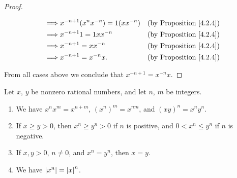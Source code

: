 \begin{proof}
\begin{itemize}
\begin{align*}
                  \implies & x^{-n + 1} (x^n x^{-n}) = 1(x x^{-n}) & \text{(by Proposition \ref{4.2.4})} \\
                  \implies & x^{-n + 1} 1 = 1x x^{-n}              & \text{(by Proposition \ref{4.2.4})} \\
                  \implies & x^{-n + 1} = x x^{-n}                 & \text{(by Proposition \ref{4.2.4})} \\
                  \implies & x^{-n + 1} = x^{-n} x.                & \text{(by Proposition \ref{4.2.4})}
              \end{align*}
    \end{itemize}
    From all cases above we conclude that \(x^{-n + 1} = x^{-n} x\).
\end{proof}

\begin{proposition}\label{4.3.12}
    Let \(x\), \(y\) be nonzero rational numbers, and let \(n\), \(m\) be integers.
    \begin{enumerate}
        \item We have \(x^n x^m = x^{n + m}\), \((x^n)^m = x^{nm}\), and \((xy)^n = x^n y^n\).
        \item If \(x \geq y > 0\), then \(x^n \geq y^n > 0\) if \(n\) is positive, and \(0 < x^n \leq y^n\) if \(n\) is negative.
        \item If \(x, y > 0\), \(n \neq 0\), and \(x^n = y^n\), then \(x = y\).
        \item We have \(\abs*{x^n} = \abs*{x}^n\).
    \end{enumerate}
\end{proposition}

